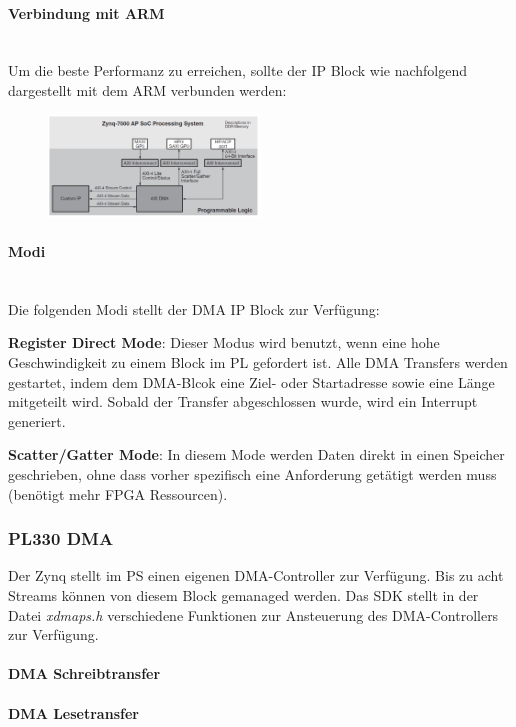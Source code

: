 \begin{multicols}{2}
\paragraph{Verbindung mit ARM}$~$ \\
Um die beste  Performanz zu erreichen, sollte der IP Block wie nachfolgend dargestellt mit dem ARM verbunden werden:
\begin{figure}[H]
    \includegraphics[width=0.5\textwidth]{images/sdk_dmaip.png}
\end{figure}

\paragraph{Modi}$~$ \\
Die folgenden Modi stellt der DMA IP Block zur Verfügung:
\begin{compactitem}
    \item \textbf{Register Direct Mode}: Dieser Modus wird benutzt, wenn eine hohe Geschwindigkeit zu einem Block im PL gefordert ist. Alle DMA Transfers werden gestartet, indem dem DMA-Blcok eine Ziel- oder Startadresse sowie eine Länge mitgeteilt wird. Sobald der Transfer abgeschlossen wurde, wird ein Interrupt generiert.
    \item \textbf{Scatter/Gatter Mode}: In diesem Mode werden Daten direkt in einen Speicher geschrieben, ohne dass vorher spezifisch eine Anforderung getätigt werden muss (benötigt mehr FPGA Ressourcen).
\end{compactitem}
\end{multicols}
\subsubsection{PL330 DMA}
Der Zynq stellt im PS einen eigenen DMA-Controller zur Verfügung. Bis zu acht Streams können von diesem Block gemanaged werden. Das SDK stellt in der Datei \textit{xdmaps.h} verschiedene Funktionen zur Ansteuerung des DMA-Controllers zur Verfügung.

\paragraph{DMA Schreibtransfer}


\paragraph{DMA Lesetransfer}

